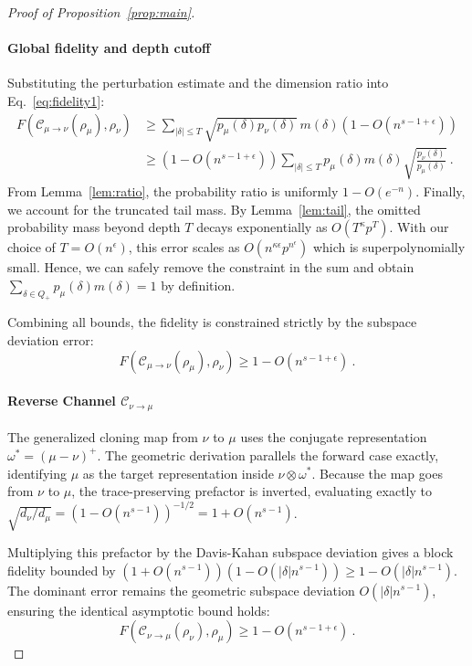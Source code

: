 \documentclass[11pt,letterpaper]{article}
\begin{document}
\begin{proof}[Proof of Proposition~\ref{prop:main}]
\paragraph{Global fidelity and depth cutoff}
Substituting the perturbation estimate and the dimension ratio into Eq.~\eqref{eq:fidelity1}:
\begin{align}
    F(\mathcal{C}_{\mu\to\nu}(\rho_\mu), \rho_\nu) &\ge \sum_{|\delta|\le T} \sqrt{p_\mu(\delta) p_\nu(\delta)} \, m(\delta) (1 - O(n^{s-1+\epsilon})) \nonumber \\
    &\ge \left(1 - O(n^{s-1+\epsilon})\right) \sum_{|\delta|\le T} p_\mu(\delta) m(\delta) \sqrt{\frac{p_\nu(\delta)}{p_\mu(\delta)}} \ .
\end{align}
From Lemma~\ref{lem:ratio}, the probability ratio is uniformly $1 - O(e^{-n})$.
Finally, we account for the truncated tail mass. By Lemma~\ref{lem:tail}, the omitted probability mass beyond depth $T$ decays exponentially as $O(T^{\kappa} p^T)$. With our choice of $T = O(n^\epsilon)$, this error scales as $O(n^{\kappa\epsilon}p^{n^\epsilon})$ which is superpolynomially small. Hence, we can safely remove the constraint in the sum and obtain $\sum_{\delta\in Q_+} p_\mu(\delta) m(\delta)=1$ by definition.

Combining all bounds, the fidelity is constrained strictly by the subspace deviation error:
\begin{equation}
    F(\mathcal{C}_{\mu\to\nu}(\rho_\mu), \rho_\nu) \ge 1 - O(n^{s-1+\epsilon}) \ .
\end{equation}

\paragraph{Reverse Channel $\mathcal{C}_{\nu\to\mu}$}
The generalized cloning map from $\nu$ to $\mu$ uses the conjugate representation $\omega^* = (\mu-\nu)^+$. The geometric derivation parallels the forward case exactly, identifying $\mu$ as the target representation inside $\nu \otimes \omega^*$. Because the map goes from $\nu$ to $\mu$, the trace-preserving prefactor is inverted, evaluating exactly to $\sqrt{d_\nu / d_\mu} = (1 - O(n^{s-1}))^{-1/2} = 1 + O(n^{s-1})$.

Multiplying this prefactor by the Davis-Kahan subspace deviation gives a block fidelity bounded by $(1 + O(n^{s-1}))(1 - O(|\delta| n^{s-1})) \ge 1 - O(|\delta| n^{s-1})$. The dominant error remains the geometric subspace deviation $O(|\delta| n^{s-1})$, ensuring the identical asymptotic bound holds:
\begin{equation}
    F(\mathcal{C}_{\nu\to\mu}(\rho_\nu), \rho_\mu) \ge 1 - O(n^{s-1+\epsilon}) \ .
\end{equation}
\end{proof}
\end{document}
